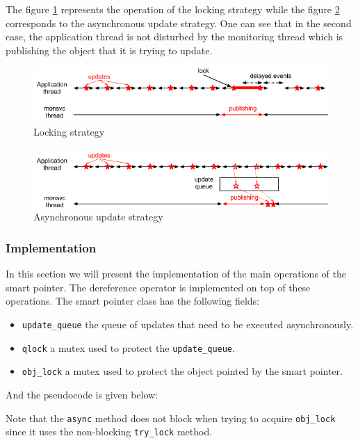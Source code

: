 The figure \ref{fig:sync_ptr} represents the operation of the locking strategy while the figure \ref{fig:async_ptr} corresponds to the asynchronous update strategy. One can see that in the second case, the application thread is not disturbed by the monitoring thread which is publishing the object that it is trying to update.
\begin{figure}[ht!]
\centering
\includegraphics[scale=0.6]{../Images/async_before.png}
\caption{Locking strategy}
\label{fig:sync_ptr}
\end{figure}

\begin{figure}[ht!]
\centering
\includegraphics[scale=0.6]{../Images/async_after.png}
\caption{Asynchronous update strategy}
\label{fig:async_ptr}
\end{figure}

\subsubsection*{Implementation}

In this section we will present the implementation of the main operations of the smart pointer. The dereference operator is implemented on top of these operations. The smart pointer class has the following fields:
\begin{itemize}
\item {\tt update\_queue} the queue of updates that need to be executed asynchronously.
\item {\tt qlock} a mutex used to protect the {\tt update\_queue}.
\item {\tt obj\_lock} a mutex used to protect the object pointed by the smart pointer.
\end{itemize}
And the pseudocode is given below:

Note that the {\tt async} method does not block when trying to acquire {\tt obj\_lock} since it uses the non-blocking {\tt try\_lock} method. 

